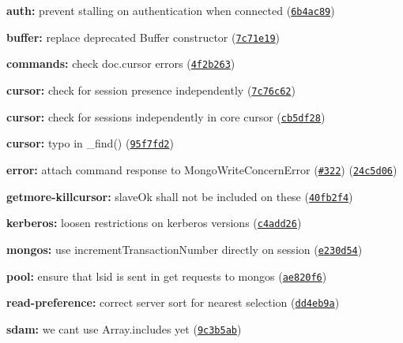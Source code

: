 \begin{DoxyItemize}
\item {\bfseries auth\+:} prevent stalling on authentication when connected (\href{https://github.com/mongodb-js/mongodb-core/commit/6b4ac89}{\tt 6b4ac89})
\item {\bfseries buffer\+:} replace deprecated Buffer constructor (\href{https://github.com/mongodb-js/mongodb-core/commit/7c71e19}{\tt 7c71e19})
\item {\bfseries commands\+:} check doc.\+cursor errors (\href{https://github.com/mongodb-js/mongodb-core/commit/4f2b263}{\tt 4f2b263})
\item {\bfseries cursor\+:} check for session presence independently (\href{https://github.com/mongodb-js/mongodb-core/commit/7c76c62}{\tt 7c76c62})
\item {\bfseries cursor\+:} check for sessions independently in core cursor (\href{https://github.com/mongodb-js/mongodb-core/commit/cb5df28}{\tt cb5df28})
\item {\bfseries cursor\+:} typo in \+\_\+find() (\href{https://github.com/mongodb-js/mongodb-core/commit/95f7fd2}{\tt 95f7fd2})
\item {\bfseries error\+:} attach command response to Mongo\+Write\+Concern\+Error (\href{https://github.com/mongodb-js/mongodb-core/issues/322}{\tt \#322}) (\href{https://github.com/mongodb-js/mongodb-core/commit/24c5d06}{\tt 24c5d06})
\item {\bfseries getmore-\/killcursor\+:} slave\+Ok shall not be included on these (\href{https://github.com/mongodb-js/mongodb-core/commit/40fb2f4}{\tt 40fb2f4})
\item {\bfseries kerberos\+:} loosen restrictions on kerberos versions (\href{https://github.com/mongodb-js/mongodb-core/commit/c4add26}{\tt c4add26})
\item {\bfseries mongos\+:} use {\ttfamily increment\+Transaction\+Number} directly on session (\href{https://github.com/mongodb-js/mongodb-core/commit/e230d54}{\tt e230d54})
\item {\bfseries pool\+:} ensure that lsid is sent in get requests to mongos (\href{https://github.com/mongodb-js/mongodb-core/commit/ae820f6}{\tt ae820f6})
\item {\bfseries read-\/preference\+:} correct server sort for {\ttfamily nearest} selection (\href{https://github.com/mongodb-js/mongodb-core/commit/dd4eb9a}{\tt dd4eb9a})
\item {\bfseries sdam\+:} we can\textquotesingle{}t use Array.\+includes yet (\href{https://github.com/mongodb-js/mongodb-core/commit/9c3b5ab}{\tt 9c3b5ab})

\end{DoxyItemize}
